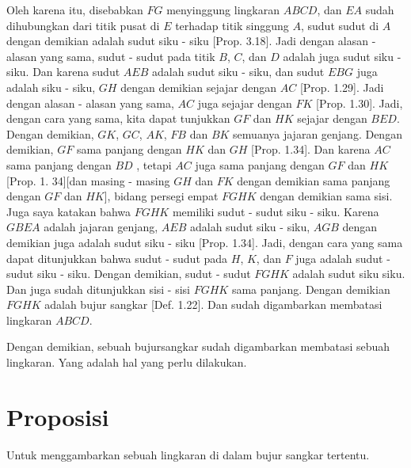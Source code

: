 \documentclass[a4paper]{book}
\begin{document}
Oleh karena itu,  disebabkan $FG$ menyinggung lingkaran $ABCD$, dan $EA$ sudah
dihubungkan dari titik pusat di $E$ terhadap titik singgung $A$, sudut sudut di 
$A$ dengan demikian adalah sudut siku - siku [Prop. 3.18]. 
Jadi dengan alasan - alasan yang sama,  
sudut - sudut pada titik $B$, $C$, dan $D$ adalah juga sudut
siku - siku. Dan karena sudut $AEB$ adalah sudut siku - siku, dan sudut $EBG$ juga
adalah siku - siku, $GH$ dengan demikian sejajar dengan $AC$ [Prop. 1.29]. Jadi
dengan alasan - alasan yang sama, $AC$ juga sejajar dengan $FK$ [Prop. 1.30].
Jadi, dengan cara yang sama, kita dapat tunjukkan $GF$ dan $HK$ sejajar dengan
$BED$. Dengan demikian, $GK$, $GC$, $AK$, $FB$ dan $BK$ semuanya jajaran genjang.
Dengan demikian, $GF$ sama panjang dengan $HK$ dan $GH$ [Prop. 1.34]. Dan karena
$AC$ sama panjang dengan $BD$ , tetapi $AC$ juga sama panjang dengan $GF$ dan $HK$
[Prop. 1. 34][dan masing - masing $GH$ dan $FK$ dengan demikian sama panjang 
dengan $GF$ dan $HK$], bidang persegi empat $FGHK$ dengan demikian sama sisi. Juga
saya katakan bahwa $FGHK$ memiliki sudut - sudut siku - siku. Karena $GBEA$
adalah jajaran genjang, $AEB$ adalah sudut siku - siku, $AGB$ dengan demikian
juga adalah sudut siku - siku [Prop. 1.34]. Jadi, dengan cara yang sama dapat
ditunjukkan bahwa sudut - sudut pada $H$, $K$, dan $F$ juga adalah sudut - sudut
siku - siku. Dengan demikian, sudut - sudut $FGHK$ adalah sudut siku siku. Dan 
juga sudah ditunjukkan sisi - sisi $FGHK$ sama panjang. Dengan demikian $FGHK$ 
adalah bujur sangkar [Def. 1.22]. Dan sudah digambarkan membatasi lingkaran 
$ABCD$.

Dengan demikian, sebuah bujursangkar sudah digambarkan membatasi sebuah lingkaran.
Yang adalah hal yang perlu dilakukan.

\section*{\centering Proposisi \thesection}
Untuk menggambarkan sebuah lingkaran di dalam bujur sangkar tertentu.
\begin{center} 
\end{center} 
\end{document}
